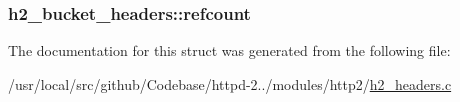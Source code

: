 \subsubsection[{\texorpdfstring{refcount}{refcount}}]{ h2\+\_\+bucket\+\_\+headers\+::refcount}\hypertarget{structh2__bucket__headers_a0e9a661efb134b4d7b62b046d0e35b37}{}\label{structh2__bucket__headers_a0e9a661efb134b4d7b62b046d0e35b37}


The documentation for this struct was generated from the following file\+:\begin{DoxyCompactItemize}
\item 
/usr/local/src/github/\+Codebase/httpd-\/2../modules/http2/\hyperlink{h2__headers_8c}{h2\+\_\+headers.\+c}\end{DoxyCompactItemize}
